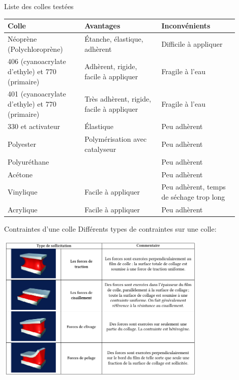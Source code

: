 \begin{frame}{Liste des colles testées}
	\begin{tabular}{|p{0.3\linewidth}|p{0.3\linewidth}|p{0.3\linewidth}|}
		\hline
		Colle & Avantages & Inconvénients \\
		\hline

		\rowcolor{OrangeT}
		Néoprène (Polychloroprène) &
		Étanche, élastique, adhèrent &
		Difficile à appliquer \\
		\hline

		\rowcolor{OrangeT}
		406 (cyanoacrylate d'ethyle) et 770 (primaire) &
		Adhèrent, rigide, facile à appliquer &
		Fragile à l'eau \\
		\hline

		\rowcolor{GreenT}
		401 (cyanoacrylate d'ethyle) et 770 (primaire) &
		Très adhèrent, rigide, facile à appliquer &
		Fragile à l'eau \\
		\hline

		\rowcolor{RedT}
		330 et activateur &
		Élastique &
		Peu adhèrent \\
		\hline

		\rowcolor{RedT}
		Polyester &
		Polymérisation avec catalyseur &
		Peu adhèrent \\
		\hline
		
		\rowcolor{RedT}
		Polyuréthane &
		& Peu adhèrent \\
		\hline

		\rowcolor{RedT}
		Acétone &
		& Peu adhèrent \\
		\hline
		
		\rowcolor{RedT}
		Vinylique &
		Facile à appliquer &
		Peu adhèrent, temps de séchage trop long \\
		\hline

		\rowcolor{RedT}
		Acrylique &
		Facile à appliquer &
		Peu adhèrent \\
		\hline

	\end{tabular}
\end{frame}

\begin{frame}{Contraintes d'une colle}
  Différents types de contraintes sur une colle:
  \begin{center}
    \includegraphics[width=10cm]{../Images/colle_contraintes.png}
  \end{center}
\end{frame}

